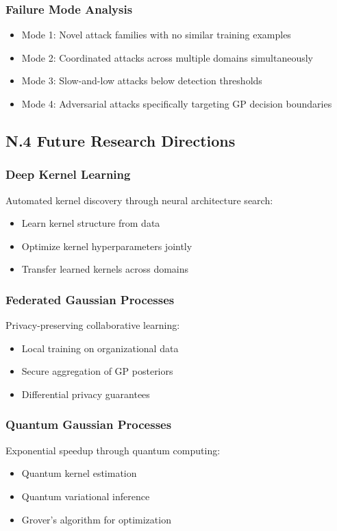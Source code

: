 \documentclass[12pt]{article}
\begin{document}
\subsubsection{Failure Mode Analysis}
\begin{itemize}
\item Mode 1: Novel attack families with no similar training examples
\item Mode 2: Coordinated attacks across multiple domains simultaneously
\item Mode 3: Slow-and-low attacks below detection thresholds
\item Mode 4: Adversarial attacks specifically targeting GP decision boundaries
\end{itemize}

\subsection{N.4 Future Research Directions}

\subsubsection{Deep Kernel Learning}
Automated kernel discovery through neural architecture search:
\begin{itemize}
\item Learn kernel structure from data
\item Optimize kernel hyperparameters jointly
\item Transfer learned kernels across domains
\end{itemize}

\subsubsection{Federated Gaussian Processes}
Privacy-preserving collaborative learning:
\begin{itemize}
\item Local training on organizational data
\item Secure aggregation of GP posteriors
\item Differential privacy guarantees
\end{itemize}

\subsubsection{Quantum Gaussian Processes}
Exponential speedup through quantum computing:
\begin{itemize}
\item Quantum kernel estimation
\item Quantum variational inference
\item Grover's algorithm for optimization
\end{itemize}
\end{document}
